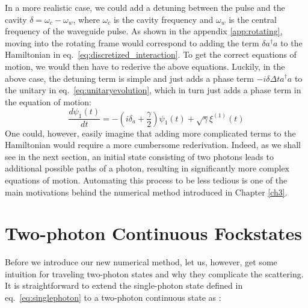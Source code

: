 In a more realistic case, we could add a detuning between the pulse and the cavity $\delta = \omega_{c} - \omega_{w}$, where $\omega_{c}$ is the cavity frequency and $\omega_{w}$ is the central frequency of the waveguide pulse. As shown in the appendix \ref{app:rotating}, moving into the rotating frame would correspond to adding the term $\delta a^\dagger a$ to the Hamiltonian in eq.~\eqref{eq:discretized_interaction}. To get the correct equations of motion, we would then have to rederive the above equations. Luckily, in the above case, the detuning term is simple and just adds a phase term $-i\delta \Delta t a^\dagger a$ to the unitary in eq.~\eqref{eq:unitaryevolution}, which in turn just adds a phase term in the equation of motion:
\begin{equation}
    \frac{d \psi_1(t)}{d t}  = -(i \delta_a +\frac{\gamma}{2}) \psi_1(t) + \sqrt{\gamma} \xi^{(1)}(t) \label{eq:single_EOM}
\end{equation}
One could, however, easily imagine that adding more complicated terms to the Hamiltonian would require a more cumbersome rederivation. Indeed, as we shall see in the next section, an initial state consisting of two photons leads to additional possible paths of a photon, resulting in significantly more complex equations of motion. Automating this process to be less tedious is one of the main motivations behind the numerical method introduced in Chapter \ref{ch3}.

\section{Two-photon Continuous Fockstates \label{sec:twophoton_continuous}}
Before we introduce our new numerical method, let us, however, get some intuition for traveling two-photon states and why they complicate the scattering. 
It is straightforward to extend the single-photon state defined in eq.~\eqref{eq:singlephoton} to a two-photon continuous state as \cite{Baragiola2012N-PhotonSystem}:

